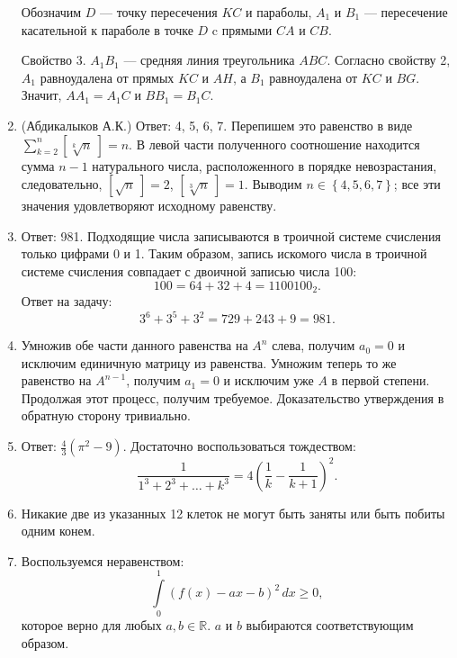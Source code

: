 \begin{enumerate}
Обозначим $D$ --- точку пересечения $KC$ и параболы, $A_1$ и $B_1$ --- пересечение касательной к параболе в точке $D$ c прямыми $CA$ и $CB$. 

Свойство 3. $A_1B_1$ --- средняя линия треугольника $ABC$. Согласно свойству 2, $A_1$ равноудалена от прямых $KC$ и $AH$, а $B_1$ равноудалена от $KC$ и $BG$. Значит, $AA_1 = A_1C$ и $BB_1 = B_1C$. 

\item (Абдикалыков А.К.) Ответ: 4, 5, 6, 7. Перепишем это равенство в виде $\displaystyle\sum\limits_{k=2}^n{\left[\sqrt[k]{n}~\right]}=n$. В левой части полученного соотношение находится сумма $n-1$ натурального числа, расположенного в порядке невозрастания, следовательно, $\left[\sqrt{n}~\right]=2$, $\left[\sqrt[3]{n}~\right]=1$. Выводим $n\in\left\{4, 5, 6, 7\right\}$; все эти значения удовлетворяют исходному равенству.


\item Ответ: 981. Подходящие числа записываются в троичной системе счисления только цифрами 0 и 1. Таким образом, запись искомого числа в троичной системе счисления совпадает с двоичной записью числа 100: $$100 = 64 + 32 + 4 = 1100100_2.$$
Ответ на задачу: $$3^6 + 3^5 + 3^2 = 729 + 243 + 9 = 981.$$

\item Умножив обе части данного равенства на $A^n$ слева, получим $a_0=0$ и исключим единичную матрицу из равенства. Умножим теперь то же равенство на $A^{n-1}$, получим $a_1=0$ и исключим уже $A$ в первой степени. Продолжая этот процесс, получим требуемое. Доказательство утверждения в обратную сторону тривиально.

\item Ответ: $\frac{4}{3} (\pi^2 - 9)$. Достаточно воспользоваться тождеством:
$$\frac{1}{1^3 + 2^3 + \hdots + k^3} = 4 \left(\frac{1}{k} - \frac{1}{k+1}\right)^2.$$

\item Никакие две из указанных 12 клеток не могут быть заняты или быть побиты одним конем.

\begin{center}
\end{center}

\item Воспользуемся неравенством:
$$\int\limits_{0}^{1} \left(f(x) - ax - b\right)^2\,dx \geqslant 0,$$
которое верно для любых $a, b \in \mathbb{R}$. $a$ и $b$ выбираются соответствующим образом.

\end{enumerate}

